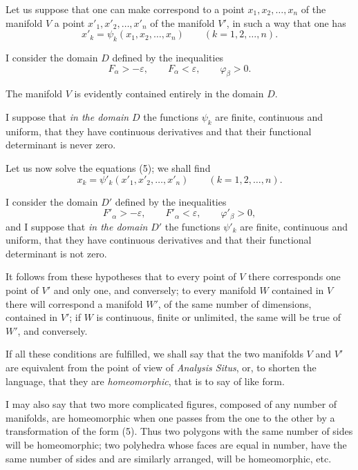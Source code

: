 \documentclass{article}
\begin{document}
Let us suppose that one can make correspond to a point $x_{1}, x_{2}, \ldots, x_{n}$ of the manifold $V$ a point $x'_{1}, x'_{2}, \ldots, x'_{n}$ of the manifold $V'$, in such a way that one has
\[
x'_{k} = \psi_{k}(x_{1}, x_{2}, \ldots, x_{n}) \qquad (k = 1, 2, \ldots, n).
\tag{5}
\]

I consider the domain $D$ defined by the inequalities
\[
F_{\alpha} > -\varepsilon, \qquad F_{\alpha} < \varepsilon, \qquad \varphi_{\beta} > 0.
\]

The manifold $V$ is evidently contained entirely in the domain $D$.

I suppose that \emph{in the domain} $D$ the functions $\psi_{k}$ are finite, continuous and uniform, that they have continuous derivatives and that their functional determinant is never zero.

Let us now solve the equations (5); we shall find
\[
x_{k} = \psi'_{k}(x'_{1}, x'_{2}, \ldots, x'_{n}) \qquad (k = 1, 2, \ldots, n).
\tag{6}
\]

I consider the domain $D'$ defined by the inequalities
\[
F'_{\alpha} > -\varepsilon, \qquad F'_{\alpha} < \varepsilon, \qquad \varphi'_{\beta} > 0,
\]
and I suppose that \emph{in the domain} $D'$ the functions $\psi'_{k}$ are finite, continuous and uniform, that they have continuous derivatives and that their functional determinant is not zero.

It follows from these hypotheses that to every point of $V$ there corresponds one point of $V'$ and only one, and conversely; to every manifold $W$ contained in $V$ there will correspond a manifold $W'$, of the same number of dimensions, contained in $V'$; if $W$ is continuous, finite or unlimited, the same will be true of $W'$, and conversely.

If all these conditions are fulfilled, we shall say that the two manifolds $V$ and $V'$ are equivalent from the point of view of \emph{Analysis Situs}, or, to shorten the language, that they are \emph{homeomorphic}, that is to say of like form.

I may also say that two more complicated figures, composed of any number of manifolds, are homeomorphic when one passes from the one to the other by a transformation of the form (5).
Thus two polygons with the same number of sides will be homeomorphic; two polyhedra whose faces are equal in number, have the same number of sides and are similarly arranged, will be homeomorphic, etc.
\end{document}
